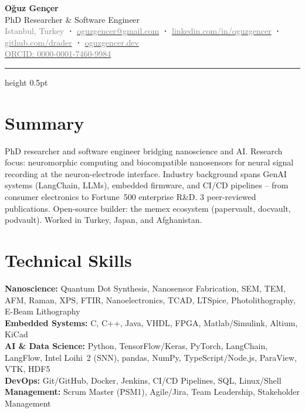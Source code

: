 \documentclass[letterpaper,10.5pt]{article}
\newcommand{\myname}[1]{{\Huge\bfseries #1}}
\newcommand{\myrole}[1]{{\large\color{accent} #1}}
\begin{document}
\begin{center}
  \myname{O\u{g}uz Gen\c{c}er} \\[5pt]
  \myrole{PhD Researcher \& Software Engineer} \\[6pt]
  \small
  \textcolor{gray}{Istanbul, Turkey}
  \;\textbf{\textcolor{accent}{·}}\;
  \href{mailto:oguzgencer@gmail.com}{\textcolor{gray}{oguzgencer@gmail.com}}
  \;\textbf{\textcolor{accent}{·}}\;
  \href{https://linkedin.com/in/oguzgencer}{\textcolor{gray}{linkedin.com/in/oguzgencer}}
  \;\textbf{\textcolor{accent}{·}}\;
  \href{https://github.com/drader}{\textcolor{gray}{github.com/drader}}
  \;\textbf{\textcolor{accent}{·}}\;
  \href{https://oguzgencer.dev}{\textcolor{gray}{oguzgencer.dev}}
  \\[3pt]
  \href{https://orcid.org/0000-0001-7460-9984}{\textcolor{gray}{ORCID: 0000-0001-7460-9984}}
\end{center}

\vspace{2pt}
{\color{accent!30}\hrule height 0.5pt}
\vspace{6pt}

\section{Summary}
\small{
PhD researcher and software engineer bridging nanoscience and AI. Research focus: neuromorphic computing and biocompatible nanosensors for neural signal recording at the neuron-electrode interface. Industry background spans GenAI systems (LangChain, LLMs), embedded firmware, and CI/CD pipelines -- from consumer electronics to Fortune~500 enterprise R\&D. 3 peer-reviewed publications. Open-source builder: the memex ecosystem (papervault, docvault, podvault). Worked in Turkey, Japan, and Afghanistan.
}
\vspace{-2pt}

\section{Technical Skills}
\begin{itemize}[leftmargin=0.15in, label={}]
  \small{\item{
    \textbf{\textcolor{accent}{Nanoscience:}} Quantum Dot Synthesis, Nanosensor Fabrication, SEM, TEM, AFM, Raman, XPS, FTIR, Nanoelectronics, TCAD, LTSpice, Photolithography, E-Beam Lithography \\[2pt]
    \textbf{\textcolor{accent}{Embedded Systems:}} C, C++, Java, VHDL, FPGA, Matlab/Simulink, Altium, KiCad \\[2pt]
    \textbf{\textcolor{accent}{AI \& Data Science:}} Python, TensorFlow/Keras, PyTorch, LangChain, LangFlow, Intel Loihi~2 (SNN), pandas, NumPy, TypeScript/Node.js, ParaView, VTK, HDF5 \\[2pt]
    \textbf{\textcolor{accent}{DevOps:}} Git/GitHub, Docker, Jenkins, CI/CD Pipelines, SQL, Linux/Shell \\[2pt]
    \textbf{\textcolor{accent}{Management:}} Scrum Master (PSM1), Agile/Jira, Team Leadership, Stakeholder Management
  }}
\end{itemize}
\end{document}

